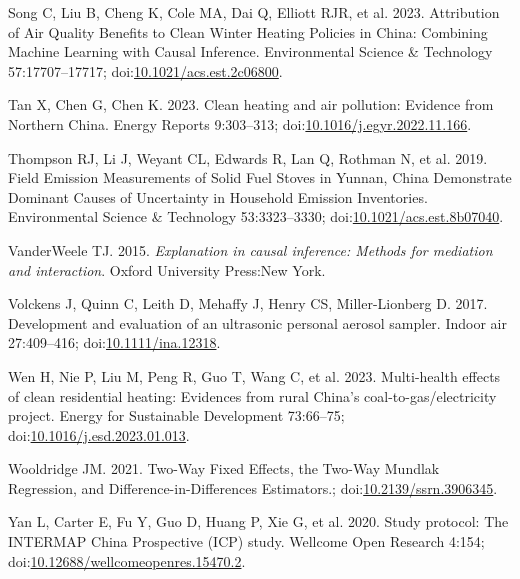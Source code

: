 \documentclass[
  letterpaper,
  DIV=11,
  numbers=noendperiod]{scrartcl}
\newlength{\cslhangindent}
\newlength{\cslentryspacingunit} %
\newenvironment{CSLReferences}[2] %
 {%
  \setlength{\parindent}{0pt}
  \ifodd #1
  \let\oldpar\par
  \def\par{\hangindent=\cslhangindent\oldpar}
  \fi
  \setlength{\parskip}{#2\cslentryspacingunit}
 }%
 {}
\begin{document}
\begin{CSLReferences}{1}{0}
\leavevmode{}%
Song C, Liu B, Cheng K, Cole MA, Dai Q, Elliott RJR, et al. 2023.
Attribution of {Air Quality Benefits} to {Clean Winter Heating Policies}
in {China}: {Combining Machine Learning} with {Causal Inference}.
Environmental Science \& Technology 57:17707--17717;
doi:\href{https://doi.org/10.1021/acs.est.2c06800}{10.1021/acs.est.2c06800}.

\leavevmode{}%
Tan X, Chen G, Chen K. 2023. Clean heating and air pollution: {Evidence}
from {Northern China}. Energy Reports 9:303--313;
doi:\href{https://doi.org/10.1016/j.egyr.2022.11.166}{10.1016/j.egyr.2022.11.166}.

\leavevmode{}%
Thompson RJ, Li J, Weyant CL, Edwards R, Lan Q, Rothman N, et al. 2019.
Field {Emission Measurements} of {Solid Fuel Stoves} in {Yunnan}, {China
Demonstrate Dominant Causes} of {Uncertainty} in {Household Emission
Inventories}. Environmental Science \& Technology 53:3323--3330;
doi:\href{https://doi.org/10.1021/acs.est.8b07040}{10.1021/acs.est.8b07040}.

\leavevmode{}%
VanderWeele TJ. 2015. \emph{Explanation in causal inference: Methods for
mediation and interaction}. Oxford University Press:New York.

\leavevmode{}%
Volckens J, Quinn C, Leith D, Mehaffy J, Henry CS, Miller-Lionberg D.
2017. Development and evaluation of an ultrasonic personal aerosol
sampler. Indoor air 27:409--416;
doi:\href{https://doi.org/10.1111/ina.12318}{10.1111/ina.12318}.

\leavevmode{}%
Wen H, Nie P, Liu M, Peng R, Guo T, Wang C, et al. 2023. Multi-health
effects of clean residential heating: {Evidences} from rural {China}'s
coal-to-gas/electricity project. Energy for Sustainable Development
73:66--75;
doi:\href{https://doi.org/10.1016/j.esd.2023.01.013}{10.1016/j.esd.2023.01.013}.

\leavevmode{}%
Wooldridge JM. 2021. Two-{Way Fixed Effects}, the {Two-Way Mundlak
Regression}, and {Difference-in-Differences Estimators}.;
doi:\href{https://doi.org/10.2139/ssrn.3906345}{10.2139/ssrn.3906345}.

\leavevmode{}%
Yan L, Carter E, Fu Y, Guo D, Huang P, Xie G, et al. 2020. Study
protocol: {The INTERMAP China Prospective} ({ICP}) study. Wellcome Open
Research 4:154;
doi:\href{https://doi.org/10.12688/wellcomeopenres.15470.2}{10.12688/wellcomeopenres.15470.2}.


\end{CSLReferences}
\end{document}
